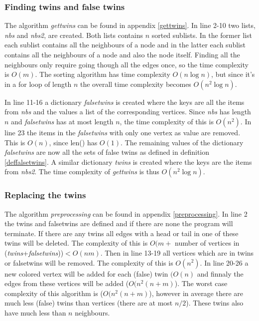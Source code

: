 \documentclass[twoside]{article}
\theoremstyle{definition}
\theoremstyle{plain}
\begin{document}
\begin{multicols}{2}
\subsubsection{Finding twins and false twins}
The algorithm \emph{gettwins} can be found in appendix \ref{gettwins}. In line 2-10 two lists, \emph{nbs} and \emph{nbs2}, are created. Both lists contains $n$ sorted sublists. In the former list each sublist contains all the neighbours of a node and in the latter each sublist contains all the neighbours of a node and also the node itself. Finding all the neighbours only require going though all the edges once, so the time complexity is $O(m)$. The sorting algorithm has time complexity $O(n \log n)$, but since it's in a for loop of length $n$ the overall time complexity becomes $O(n^2 \log n)$. 

In line 11-16 a dictionary \emph{falsetwins} is created where the keys are all the items from \emph{nbs} and the values a list of the corresponding vertices. Since \emph{nbs} has length $n$ and \emph{falsetwins} has at most length $n$, the time complexity of this is $O(n^2)$. In line 23 the items in the \emph{falsetwins} with only one vertex as value are removed. This is $O(n)$, since len() has $O(1)$.\cite{website:pythonTimeComplexity} The remaining values of the dictionary \emph{falsetwins} are now all the sets of false twins as defined in definition \ref{deffalsetwins}. A similar dictionary \emph{twins} is created where the keys are the items from \emph{nbs2}. The time complexity of \textit{gettwins} is thus $O(n^2 \log n)$.


\subsubsection{Replacing the twins}
The algorithm \emph{preprocessing} can be found in appendix \ref{preprocessing}. In line 2 the twins and falsetwins are defined and if there are none the program will terminate. If there are any twins all edges with a head or tail in one of these twins will be deleted. The complexity of this is $O(m +$ number of vertices in (\emph{twins}+\emph{falsetwins}))$ < O (nm)$. Then in line 13-19 all vertices which are in twins or falsetwins will be removed. The complexity of this is $O(n^2)$. In line 20-26 a new colored vertex will be added for each (false) twin $(O(n)$ and finnaly the edges from these vertices will be added ($O(n^2 (n+m)$). The worst case complexity of this algorithm is ($O(n^2 (n+m)$), however in average there are much less (false) twins than vertices (there are at most $n/2$). These twins also have much less than $n$ neighbours.


\end{multicols}
\end{document}

